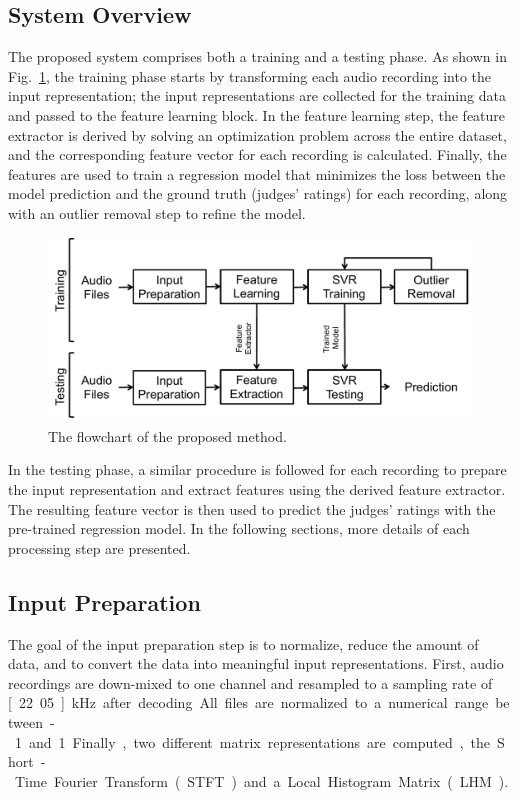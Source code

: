 \documentclass{ws-ijsc}
\begin{document}
\subsection{System Overview}
The proposed system comprises both a training and a testing phase. As shown in Fig.~\ref{fig:flowchart}, the training phase starts by transforming each audio recording into the input representation; the input representations are collected for the training data and passed to the feature learning block. In the feature learning step, the feature extractor is derived by solving an optimization problem across the entire dataset, and the corresponding feature vector for each recording is calculated. Finally, the features are used to train a regression model that minimizes the loss between the model prediction and the ground truth (judges' ratings) for each recording, along with an outlier removal step to refine the model. 

\begin{figure}
\centering
\includegraphics[width = \linewidth]{./figs/flowchart.pdf}
\caption{The flowchart of the proposed method.}
\label{fig:flowchart}
\end{figure}

In the testing phase, a similar procedure is followed for each recording to prepare the input representation and extract features using the derived feature extractor. The resulting feature vector is then used to predict the judges' ratings with the pre-trained regression model. In the following sections, more details of each processing step are presented. 

\subsection{Input Preparation}\label{subsec:input}
The goal of the input preparation step is to normalize, reduce the amount of data, and to convert the data into meaningful input representations. First, audio recordings are down-mixed to one channel and resampled to a sampling rate of \unit[22.05]{kHz} after decoding. All files are normalized to a numerical range between -1 and 1. Finally, two different matrix representations are computed, the Short-Time Fourier Transform (STFT) and a Local Histogram Matrix (LHM). 
\end{document}
